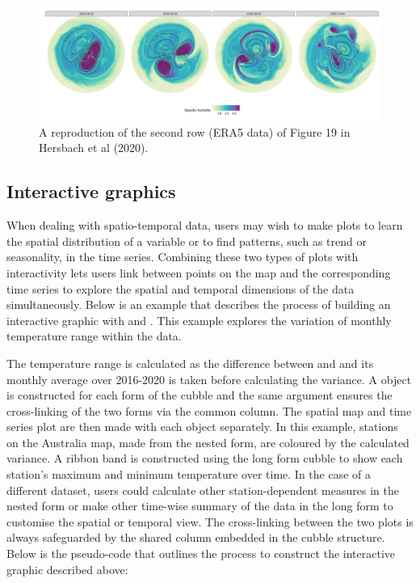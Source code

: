 \documentclass[
]{jss}
\begin{document}
\begin{CodeChunk}
\begin{figure}

{\centering \includegraphics[width=1\linewidth]{../figures/netcdf} 

}

\caption[A reproduction of the second row (ERA5 data) of Figure 19 in Hersbach et al (2020)]{A reproduction of the second row (ERA5 data) of Figure 19 in Hersbach et al (2020).}\label{fig:netcdf}
\end{figure}
\end{CodeChunk}

\hypertarget{interactive-graphics-1}{%
\subsection{Interactive graphics}\label{interactive-graphics-1}}

When dealing with spatio-temporal data, users may wish to make plots to learn the spatial distribution of a variable or to find patterns, such as trend or seasonality, in the time series. Combining these two types of plots with interactivity lets users link between points on the map and the corresponding time series to explore the spatial and temporal dimensions of the data simultaneously. Below is an example that describes the process of building an interactive graphic with  and . This example explores the variation of monthly temperature range within the  data.

The temperature range is calculated as the difference between  and  and its monthly average over 2016-2020 is taken before calculating the variance. A  object is constructed for each form of the cubble and the same  argument ensures the cross-linking of the two forms via the common  column. The spatial map and time series plot are then made with each  object separately. In this example, stations on the Australia map, made from the nested form, are coloured by the calculated variance. A ribbon band is constructed using the long form cubble to show each station's maximum and minimum temperature over time. In the case of a different dataset, users could calculate other station-dependent measures in the nested form or make other time-wise summary of the data in the long form to customise the spatial or temporal view. The cross-linking between the two plots is always safeguarded by the shared  column embedded in the cubble structure. Below is the pseudo-code that outlines the process to construct the interactive graphic described above:
\end{document}
